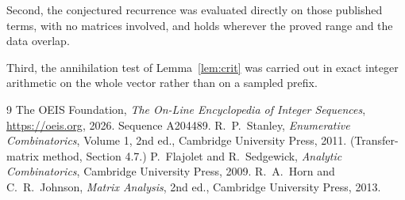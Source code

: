 \documentclass[11pt,a4paper]{article}
\theoremstyle{plain}
\theoremstyle{definition}
\begin{document}
Second, the conjectured recurrence was evaluated directly on those published terms, with no
matrices involved, and holds wherever the proved range and the data overlap.

Third, the annihilation test of Lemma~\ref{lem:crit} was carried out in exact integer
arithmetic on the whole vector rather than on a sampled prefix.

\begin{thebibliography}{9}
 The OEIS Foundation, \emph{The On-Line Encyclopedia of Integer
Sequences}, \url{https://oeis.org}, 2026. Sequence A204489.
 R.~P.~Stanley, \emph{Enumerative Combinatorics}, Volume 1, 2nd ed.,
Cambridge University Press, 2011. (Transfer-matrix method, Section 4.7.)
 P.~Flajolet and R.~Sedgewick, \emph{Analytic Combinatorics}, Cambridge
University Press, 2009.
 R.~A.~Horn and C.~R.~Johnson, \emph{Matrix Analysis}, 2nd ed., Cambridge
University Press, 2013.
\end{thebibliography}
\end{document}
